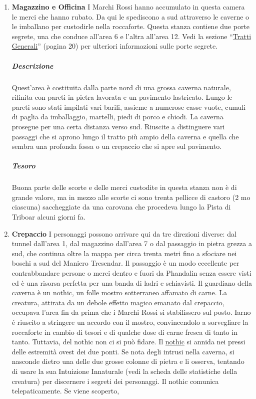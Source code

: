 \documentclass{article}
\begin{document}
\begin{enumerate}
\item \textbf{Magazzino e Officina} I Marchi Rossi hanno accumulato in questa camera le merci
che hanno rubato. Da qui le spediscono a sud attraverso le
caverne o le imballano per custodirle nella roccaforte. Questa stanza contiene due porte segrete, una che conduce
all’area 6 e l’altra all'area 12. Vedi la sezione “\hyperlink{trattigen}{Tratti Generali}”
(pagina 20) per ulteriori informazioni sulle porte segrete.
\subparagraph{Descrizione} Quest’area è costituita dalla parte nord di una grossa
caverna naturale, rifinita con pareti in pietra lavorata e un
pavimento lastricato. Lungo le pareti sono stati impilati vari
barili, assieme a numerose casse vuote, cumuli di paglia da
imballaggio, martelli, piedi di porco e chiodi.
La caverna prosegue per una certa distanza verso sud. Riuscite
a distinguere vari passaggi che si aprono lungo il tratto più
ampio della caverna e quella che sembra una profonda fossa o
un crepaccio che si apre sul pavimento.
\subparagraph{Tesoro} Buona parte delle scorte e delle merci custodite in questa
stanza non è di grande valore, ma in mezzo alle scorte ci
sono trenta pellicce di castoro (2 mo ciascuna) saccheggiate
da una carovana che procedeva lungo la Pista di Triboar
alcuni giorni fa.
\item \textbf{Crepaccio} I personaggi possono arrivare qui da tre direzioni diverse:
dal tunnel dall'area 1, dal magazzino dall’area 7 o dal
passaggio in pietra grezza a sud, che continua oltre la mappa
per circa trenta metri fino a sfociare nei boschi a sud del
Maniero Tresendar. Il passaggio è un modo eccellente per
contrabbandare persone o merci dentro e fuori da Phandalin
senza essere visti ed è una risorsa perfetta per una banda di
ladri e schiavisti.
Il guardiano della caverna è un nothic, un folle mostro
sotterraneo affamato di carne. La creatura, attirata da un
debole effetto magico emanato dal crepaccio, occupava l'area
fin da prima che i Marchi Rossi si stabilissero sul posto. Iarno
é riuscito a stringere un accordo con il mostro, convincendolo
a sorvegliare la roccaforte in cambio di tesori e di qualche
dose di carne fresca di tanto in tanto. Tuttavia, del nothic non
ci si può fidare.
Il \hyperlink{nothic}{nothic} si annida nei pressi delle estremità ovest dei
due ponti. Se nota degli intrusi nella caverna, si nasconde
dietro una delle due grosse colonne di pietra e li osserva,
tentando di usare la sua Intuizione Innaturale (vedi la scheda
delle statistiche della creatura) per discernere i segreti
dei personaggi.
Il nothic comunica telepaticamente. Se viene scoperto,

\end{enumerate}
\end{document}
